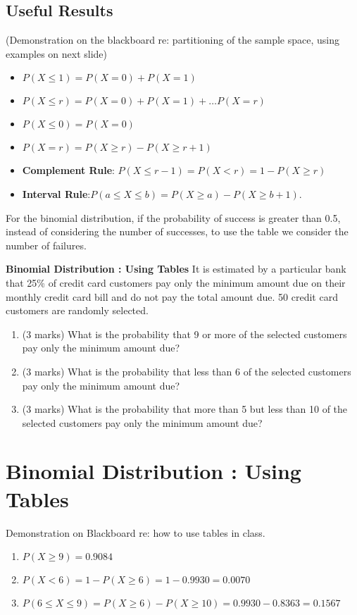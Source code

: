 \documentclass[]{report}
\begin{document}
\subsection{Useful Results}
(Demonstration on the blackboard re: partitioning of the sample space, using examples on next slide)
\begin{itemize}
\item $P(X \leq 1) = P(X=0) + P(X=1)$
\item $P(X \leq r) = P(X=0)+ P(X=1) + \ldots P(X= r)$
\item $P(X \leq 0) = P(X=0)$
\item $P(X = r) = P(X \geq r ) - P(X \geq r + 1)$
\item \textbf{Complement Rule}: $P(X \leq r-1) = P(X < r) = 1 - P(X \geq r)$
\item \textbf{Interval Rule}:$ P(a \leq X \leq  b)= P(X \geq a) - P(X \geq b + 1).$
\end{itemize}
For the binomial distribution, if the probability of success is greater than 0.5, instead of
considering the number of successes, to use the table we consider
the number of failures.

{
	\textbf{Binomial Distribution : Using Tables}
	It is estimated by a particular bank that 25\% of credit card customers pay only the minimum amount due on their monthly credit card bill and do not pay the total amount due. 50 credit card customers are randomly selected.
	\begin{enumerate}
		\item (3 marks)	What is the probability that 9 or more of the selected customers pay only the minimum amount due?
		\item (3 marks) What is the probability that less than 6 of the selected customers pay only the minimum amount due?
		\item (3 marks)	What is the probability that more than 5 but less than 10 of the selected customers pay only the minimum amount due?
	\end{enumerate}
	
	\section{Binomial Distribution : Using Tables}
	Demonstration on Blackboard re: how to use tables in class.
	\begin{enumerate}
		\item $P(X \geq 9) = 0.9084$
		\item $P(X < 6) = 1- P(X \geq 6) =1 - 0.9930 = 0.0070$
		\item $P(6 \leq X \leq 9) = P(X \geq 6) - P(X \geq 10) = 0.9930 - 0.8363 = 0.1567$
	\end{enumerate}
	
	
	
	
}
\end{document}
